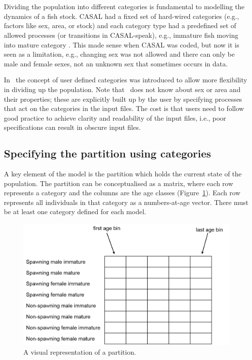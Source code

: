 \section{\label{sec:PartitionCategories}}

Dividing the population into different categories is fundamental to modelling the dynamics of a fish stock. CASAL had a fixed set of hard-wired categories (e.g., factors like sex, area, or stock) and each category type had a predefined set of allowed processes (or transitions in CASAL-speak), e.g., immature fish moving into mature category \citep{1388}. This made sense when CASAL was coded, but now it is seen as a limitation, e.g., changing sex was not allowed and there can only be male and female sexes, not an unknown sex that sometimes occurs in data. 

In \CNAME\, the concept of user defined categories was introduced to allow more flexibility in dividing up the population. Note that \CNAME\ does not know about sex or area and their properties; these are explicitly built up by the user by specifying processes that act on the categories in the input files. The cost is that users need to follow good practice to achieve clarity and readability of the input files, i.e., poor specifications can result in obscure input files.

\subsection{Specifying the partition using categories}

A key element of the model is the partition which holds the current state of the population. The partition can be conceptualised as a matrix, where each row represents a category and the columns are the age classes (Figure~\ref{Fig:part}). Each row represents all individuals in that category as a numbers-at-age vector.  There must be at least one category defined for each model.

\begin{figure}[H]
	\centering
	\includegraphics[scale=0.4]{Figures/partition2.png}
		\caption{A visual representation of a partition.}\label{Fig:part}
\end{figure}


